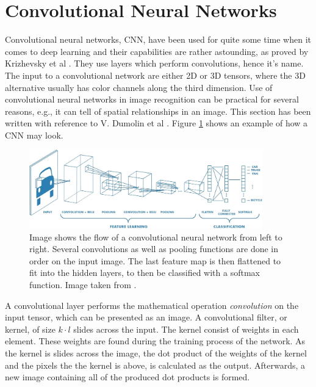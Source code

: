  \section{Convolutional Neural Networks}
 \label{sec:CNN}
Convolutional neural networks, CNN, have been used for quite some time when it comes to deep learning and their capabilities are rather astounding, as proved by Krizhevsky et al \cite{NIPS2012_4824}.  They use layers which perform convolutions, hence it's name.  The input to a convolutional network are either 2D or 3D tensors, where the 3D alternative usually has color channels along the third dimension. Use of convolutional neural networks in image recognition  can be practical for several reasons, e.g., it can tell of spatial relationships in an image. This section has been written with reference to V. Dumolin et al \cite{convArit}. Figure \ref{fig:cnn} shows an example of how a CNN may look.
 
 \begin{figure}[hbtp]
\begin{center}
\includegraphics[width = 0.9\textwidth]{./Images/convNetwork.jpg}
\caption{Image shows the flow of a convolutional neural network from left to right. Several convolutions as well as pooling functions are done in order on the input image. The last feature map is then flattened to fit into the hidden layers, to then be classified with a softmax function. Image taken from \cite{cnnImage}.}
\label{fig:cnn}
\end{center}
\end{figure}
 
A convolutional layer performs the mathematical operation \textit{convolution} on the input tensor, which can be presented as an image. A convolutional filter, or kernel, of size $k \cdot l$ slides across the input. The kernel consist of weights in each element. These weights are found during the training process of the network. As the kernel is slides across the image, the dot product of the weights of the kernel and the pixels the the kernel is above, is calculated as the output. Afterwards, a new image containing all of the produced dot products is formed.

